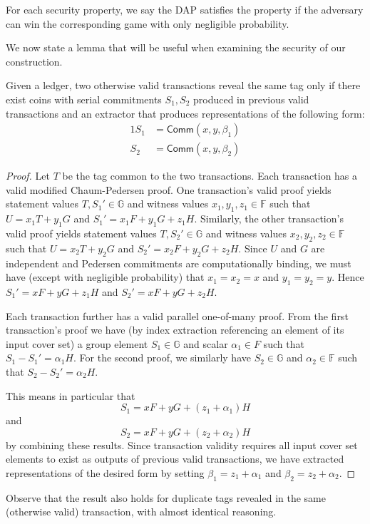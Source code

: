 \documentclass{llncs}
\newcommand{\G}{\mathbb{G}}
\newcommand{\F}{\mathbb{F}}
\newcommand{\func}[1]{\mathsf{#1}}
\newcommand{\comm}{\func{Comm}}
\begin{document}
For each security property, we say the DAP satisfies the property if the adversary can win the corresponding game with only negligible probability.

We now state a lemma that will be useful when examining the security of our construction.

\begin{lemma}\label{lem:extract}
    Given a ledger, two otherwise valid transactions reveal the same tag only if there exist coins with serial commitments $S_1,S_2$ produced in previous valid transactions and an extractor that produces representations of the following form:
    \begin{alignat*}{1}
        S_1 &= \comm(x,y,\beta_1) \\
        S_2 &= \comm(x,y,\beta_2)
    \end{alignat*}
\end{lemma}

\begin{proof}
    Let $T$ be the tag common to the two transactions.
    Each transaction has a valid modified Chaum-Pedersen proof.
    One transaction's valid proof yields statement values $T,S_1' \in \G$ and witness values $x_1,y_1,z_1 \in \F$ such that $U = x_1 T + y_1 G$ and $S_1' = x_1 F + y_1 G + z_1 H$.
    Similarly, the other transaction's valid proof yields statement values $T,S_2' \in \G$ and witness values $x_2,y_2,z_2 \in \F$ such that $U = x_2 T + y_2 G$ and $S_2' = x_2 F + y_2 G + z_2 H$.
    Since $U$ and $G$ are independent and Pedersen commitments are computationally binding, we must have (except with negligible probability) that $x_1 = x_2 = x$ and $y_1 = y_2 = y$.
    Hence $S_1' = xF + yG + z_1 H$ and $S_2' = xF + yG + z_2 H$.

    Each transaction further has a valid parallel one-of-many proof.
    From the first transaction's proof we have (by index extraction referencing an element of its input cover set) a group element $S_1 \in \G$ and scalar $\alpha_1 \in F$ such that $S_1 - S_1' = \alpha_1 H$.
    For the second proof, we similarly have $S_2 \in \G$ and $\alpha_2 \in \F$ such that $S_2 - S_2' = \alpha_2 H$.

    This means in particular that $$S_1 = xF + yG + (z_1 + \alpha_1)H$$ and $$S_2 = xF + yG + (z_2 + \alpha_2)H$$ by combining these results.
    Since transaction validity requires all input cover set elements to exist as outputs of previous valid transactions, we have extracted representations of the desired form by setting $\beta_1 = z_1 + \alpha_1$ and $\beta_2 = z_2 + \alpha_2$.
\end{proof}
Observe that the result also holds for duplicate tags revealed in the same (otherwise valid) transaction, with almost identical reasoning.
\end{document}
